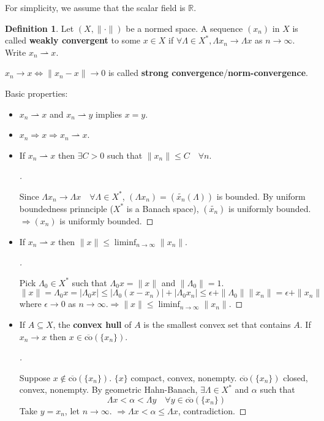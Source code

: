 \documentclass{article}
\theoremstyle{definition}
\newtheorem{dfn}{Definition}
\newenvironment{proofs}[1][\proofname]{%
  \begin{proof}[#1]$ $\par\nobreak\ignorespaces
}{%
  \end{proof}
}
\newcommand{\RR}{\mathbb R}
\newcommand{\ra}{\rightarrow}
\newcommand{\Ra}{\Rightarrow}
\begin{document}
For simplicity, we assume that the scalar field is $\RR$.

\begin{dfn}
	Let $(X, \|\cdot\|)$ be a normed space.
	A sequence $(x_n)$ in $X$ is called \textbf{weakly convergent} to some $x \in X$ if $\forall \Lambda \in X^*, \Lambda x_n \to \Lambda x$ as $n \to \infty$.
	Write $x_n \rightharpoonup x$.
\end{dfn}

$x_n \to x \Leftrightarrow \|x_n - x \| \to 0$ is called \textbf{strong convergence}/\textbf{norm-convergence}.

\par Basic properties:
\begin{itemize}
	\item $x_n \rightharpoonup x$ and $x_n \rightharpoonup y$ implies $x = y$.

	\item $x_n \Rightarrow x \Rightarrow x_n \rightharpoonup x$.

	\item If $x_n \rightharpoonup x$ then $\exists C > 0$ such that $\|x_n\| \leq C \quad \forall n$.
		\begin{proofs}
			Since $\Lambda x_n \to \Lambda x \quad \forall \Lambda \in X^*$, $(\Lambda x_n) = (\tilde{x_n}(\Lambda))$ is bounded.
			By uniform boundedness prinnciple ($X^*$ is a Banach space), $(\tilde{x_n})$ is uniformly bounded.
			$\Rightarrow (x_n)$ is uniformly bounded.
		\end{proofs}

	\item If $x_n \rightharpoonup x$ then $\|x\| \leq \liminf_{n \to \infty} \|x_n\|$.
		\begin{proofs}
			Pick $\Lambda_0 \in X^*$ such that $\Lambda_0 x = \|x\|$ and $\|\Lambda_0\| = 1$.
			\[
				\|x\| = \Lambda_0 x = |\Lambda_0 x| \leq |\Lambda_0 (x - x_n)| + |\Lambda_0 x_n| \leq \epsilon + \|\Lambda_0 \| \|x_n \| = \epsilon + \|x_n\|
			\]
			where $\epsilon \to 0$ as $n \to \infty$.$\Ra \|x\| \leq \liminf_{n \to \infty} \|x_n\|$.
		\end{proofs}

	\item If $A \subseteq X$, the \textbf{convex hull} of $A$ is the smallest convex set that contains $A$.
		If $x_n \ra x$ then $x \in \overline{\text{co}}(\{x_n\})$.
		\begin{proofs}
			Suppose $x \notin \overline{\text{co}}(\{x_n\})$.
			$\{x\}$ compact, convex, nonempty.
			$\overline{\text{co}}(\{x_n\})$ closed, convex, nonempty.
			By geometric Hahn-Banach, $\exists \Lambda \in X^*$ and $\alpha$ such that 
			\[
				\Lambda x < \alpha < \Lambda y \quad \forall y \in \overline{\text{co}}(\{x_n\})
			\]
			Take $y = x_n$, let $n \to \infty$.
			$\Rightarrow \Lambda x < \alpha \leq \Lambda x$, contradiction.
		\end{proofs}
\end{itemize}
\end{document}
